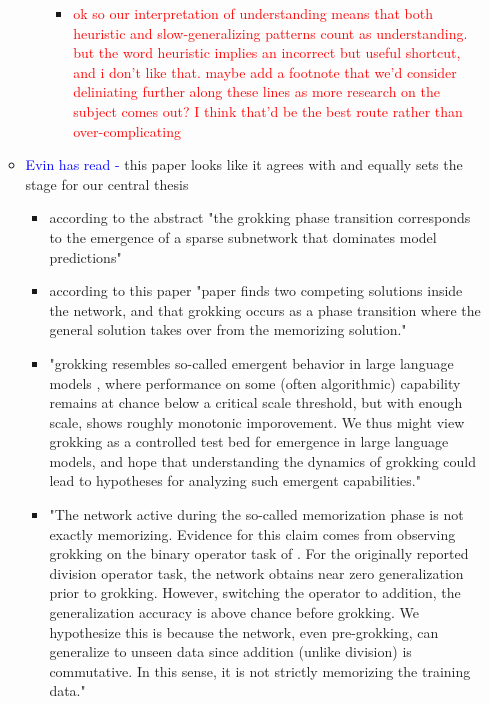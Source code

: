 \documentclass{article}
\begin{document}
\begin{itemize}
\begin{itemize}
\begin{itemize}
            \begin{itemize}
                \item \textcolor{red}{ok so our interpretation of understanding means that both heuristic and slow-generalizing patterns count as understanding. but the word heuristic implies an incorrect but useful shortcut, and i don't like that. maybe add a footnote that we'd consider deliniating further along these lines as more research on the subject comes out? I think that'd be the best route rather than over-complicating}
            \end{itemize}
        \end{itemize}
        \item \textcolor{blue}{Evin has read -} \cite{merrill2023tale} this paper looks like it agrees with \cite{varma2023explaining} and equally sets the stage for our central thesis
        \begin{itemize}
            \item according to the abstract "the grokking phase transition corresponds to the emergence of a sparse subnetwork that dominates model predictions"
            \item according to \cite{pope2023grok} this paper "paper finds two competing solutions inside the network, and that grokking occurs as a phase transition where the general solution takes over from the memorizing solution."
            \item "grokking resembles so-called emergent behavior in large language models \cite{wei2022emergent}, where performance on some (often algorithmic) capability remains at chance below a critical scale threshold, but with enough scale, shows roughly monotonic imporovement. We thus might view grokking as a controlled test bed for emergence in large language models, and hope that understanding the dynamics of grokking could lead to hypotheses for analyzing such emergent capabilities."
            \item "The network active during the so-called memorization phase is not exactly memorizing. Evidence for this claim comes from observing grokking on the binary operator task of \cite{power2022grokking}. For the originally reported division operator task, the network obtains near zero generalization prior to grokking. However, switching the operator to addition, the generalization accuracy is above chance before grokking. We hypothesize this is because the network, even pre-grokking, can generalize to unseen data since addition (unlike division) is commutative. In this sense, it is not strictly memorizing the training data."

\end{itemize}
\end{itemize}
\end{itemize}
\end{document}
